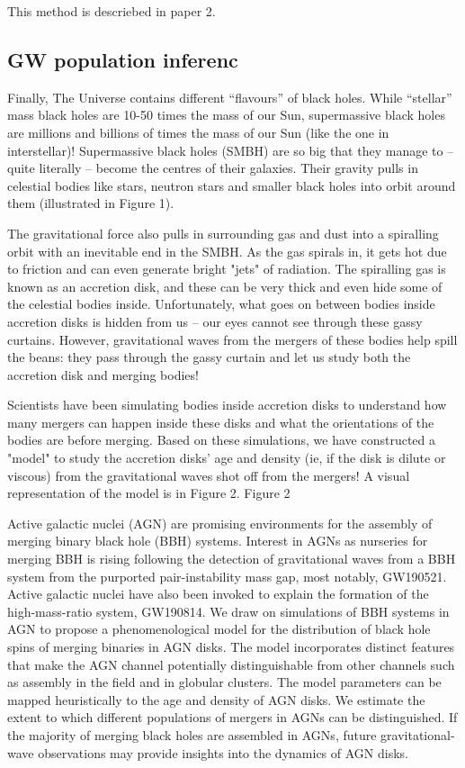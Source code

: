This method is descriebed in paper 2. 


\subsection{GW population inferenc}

Finally, 
The Universe contains different ``flavours'' of black holes. While ``stellar'' mass black holes are 10-50 times the mass of our Sun, supermassive black holes are millions and billions of times the mass of our Sun (like the one in interstellar)! Supermassive black holes (SMBH) are so big that they manage to -- quite literally -- become the centres of their galaxies. Their gravity pulls in celestial bodies like stars, neutron stars and smaller black holes into orbit around them (illustrated in Figure 1). 

The gravitational force also pulls in surrounding gas and dust into a spiralling orbit with an inevitable end in the SMBH. As the gas spirals in, it gets hot due to friction and can even generate bright "jets" of radiation. The spiralling gas is known as an accretion disk, and these can be very thick and even hide some of the celestial bodies inside. Unfortunately, what goes on between bodies inside accretion disks is hidden from us -- our eyes cannot see through these gassy curtains. However, gravitational waves from the mergers of these bodies help spill the beans: they pass through the gassy curtain and let us study both the accretion disk and merging bodies!
 
Scientists have been simulating bodies inside accretion disks to understand how many mergers can happen inside these disks and what the orientations of the bodies are before merging. Based on these simulations, we have constructed a "model" to study the accretion disks' age and density (ie, if the disk is dilute or viscous) from the gravitational waves shot off from the mergers! A visual representation of the model is in Figure 2. 
Figure 2
 
Active galactic nuclei (AGN) are promising environments for the assembly of merging binary black hole (BBH) systems. Interest in AGNs as nurseries for merging BBH is rising following the detection of gravitational waves from a BBH system from the purported pair-instability mass gap, most notably, GW190521. Active galactic nuclei have also been invoked to explain the formation of the high-mass-ratio system, GW190814. We draw on simulations of BBH systems in AGN to propose a phenomenological model for the distribution of black hole spins of merging binaries in AGN disks. The model incorporates distinct features that make the AGN channel potentially distinguishable from other channels such as assembly in the field and in globular clusters. The model parameters can be mapped heuristically to the age and density of AGN disks. We estimate the extent to which different populations of mergers in AGNs can be distinguished. If the majority of merging black holes are assembled in AGNs, future gravitational-wave observations may provide insights into the dynamics of AGN disks.






